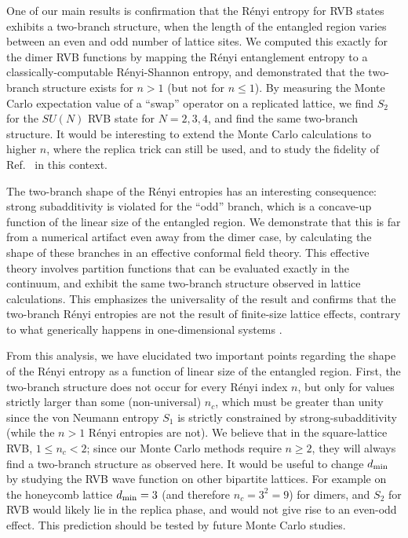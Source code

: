\documentclass[11pt]{iopart}
\begin{document}
One of our main results is confirmation that the R\'enyi entropy for RVB states exhibits a two-branch structure, when the length of the entangled region varies between an even and odd number of lattice sites. We computed this exactly for the dimer RVB functions by mapping the R\'enyi entanglement entropy to a classically-computable R\'enyi-Shannon entropy, and demonstrated that the two-branch structure exists for {$n>1$ (but not for $n\leq 1$)}.
By measuring the Monte Carlo expectation value of a ``swap'' operator on a replicated lattice, we find $S_2$ for the $SU(N)$ RVB state for $N=2,3,4$, and find the same two-branch structure. It would be interesting to extend the Monte Carlo calculations to higher $n$, where the replica trick can still be used, {and to study the fidelity of Ref.~\cite{Bipartite_fidelity} in this context.} 

The two-branch shape of the R\'enyi entropies has an interesting consequence:  strong subadditivity is violated for the ``odd'' branch, which is a concave-up function of the linear size of the entangled region.  We demonstrate that this is far from a numerical artifact even away from the dimer case, by calculating the shape of these branches in an effective conformal field theory.  This effective theory involves partition functions that can be evaluated exactly in the continuum, and exhibit the same two-branch structure observed in lattice calculations.  This emphasizes the universality of the result and confirms that the two-branch R\'enyi entropies are not the result of finite-size lattice effects, {contrary to what generically happens in one-dimensional systems \cite{Corrections_scaling1,Corrections_scaling2}.} 

From this analysis, we have elucidated two important points regarding the shape of the R\'enyi entropy as a function of linear size of the entangled region.  
First, the two-branch structure does not occur for every R\'enyi index $n$, but only for values {strictly} larger than some (non-universal) $n_c$, which must be greater than unity since the von Neumann entropy $S_1$ is strictly constrained by strong-subadditivity (while the $n>1$ R\'enyi entropies are not).  We believe that in the square-lattice RVB, {$1\leq n_c<2$}; since our Monte Carlo methods require $n\ge 2$, they will always find a two-branch structure as observed here.  
It would be useful to change $d_{\rm min}$ by studying the RVB wave function on other bipartite lattices. For example on the honeycomb lattice $d_{\rm min}=3$ (and therefore $n_c=3^2=9$) for dimers, and $S_2$ for RVB would likely lie in the replica phase, {and would not give rise to an even-odd effect.} 
This prediction should be tested by future Monte Carlo studies.
\end{document}
